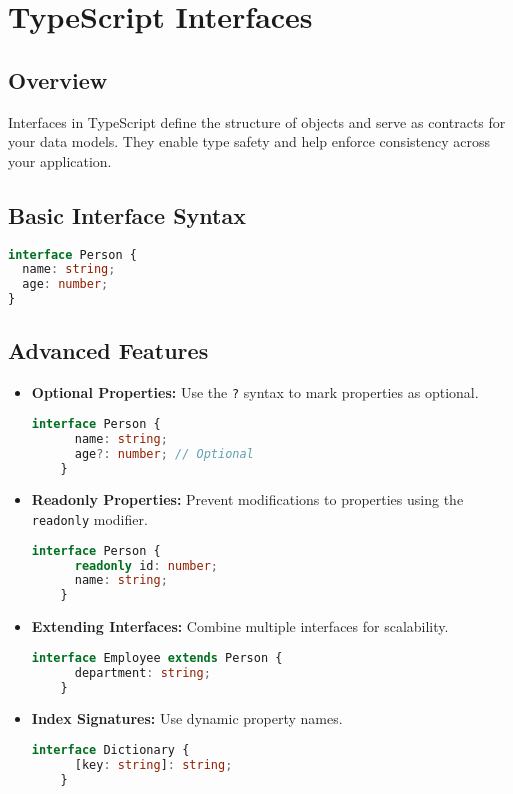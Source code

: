 \documentclass[a4paper,12pt]{article}
\begin{document}
\section{TypeScript Interfaces}
\subsection*{Overview}
Interfaces in TypeScript define the structure of objects and serve as contracts for your data models. They enable type safety and help enforce consistency across your application.

\subsection*{Basic Interface Syntax}
\begin{lstlisting}[language=TypeScript]
interface Person {
  name: string;
  age: number;
}
\end{lstlisting}

\subsection*{Advanced Features}
\begin{itemize}
    \item \textbf{Optional Properties:} Use the \texttt{?} syntax to mark properties as optional.
    \begin{lstlisting}[language=TypeScript]
    interface Person {
      name: string;
      age?: number; // Optional
    }
    \end{lstlisting}
    \item \textbf{Readonly Properties:} Prevent modifications to properties using the \texttt{readonly} modifier.
    \begin{lstlisting}[language=TypeScript]
    interface Person {
      readonly id: number;
      name: string;
    }
    \end{lstlisting}
    \item \textbf{Extending Interfaces:} Combine multiple interfaces for scalability.
    \begin{lstlisting}[language=TypeScript]
    interface Employee extends Person {
      department: string;
    }
    \end{lstlisting}
    \item \textbf{Index Signatures:} Use dynamic property names.
    \begin{lstlisting}[language=TypeScript]
    interface Dictionary {
      [key: string]: string;
    }
    \end{lstlisting}
\end{itemize}
\end{document}
